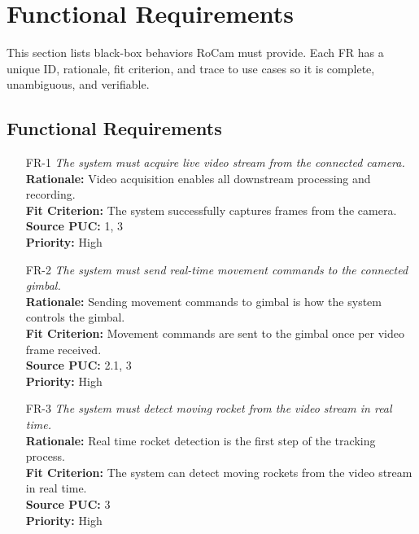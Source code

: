 \documentclass[12pt]{article}
\begin{document}
\section{Functional Requirements}
This section lists black-box behaviors RoCam must provide.
Each FR has a unique ID, rationale, fit criterion, and trace to use cases so it is complete, unambiguous, and verifiable.

\subsection{Functional Requirements}

\begin{itemize}[leftmargin=*]

  \item[FR-1] \emph{The system must acquire live video stream from the connected
          camera.}\\[2mm]
        \textbf{Rationale:} Video acquisition enables all downstream processing and recording.\\
        \textbf{Fit Criterion:} The system successfully captures frames from the camera.\\
        \textbf{Source PUC:} 1, 3 \\
        \textbf{Priority:} High

  \item[FR-2] \emph{The system must send real-time movement commands to the connected
          gimbal.}\\[2mm]
        \textbf{Rationale:} Sending movement commands to gimbal is how the system controls the gimbal.\\
        \textbf{Fit Criterion:} Movement commands are sent to the gimbal once per video frame received.\\
        \textbf{Source PUC:} 2.1, 3 \\
        \textbf{Priority:} High

  \item[FR-3] \emph{The system must detect moving rocket from the video stream in real
          time.}\\[2mm]
        \textbf{Rationale:} Real time rocket detection is the first step of the tracking process.\\
        \textbf{Fit Criterion:} The system can detect moving rockets from the video stream in real time.\\
        \textbf{Source PUC:} 3 \\
        \textbf{Priority:} High


\end{itemize}
\end{document}
